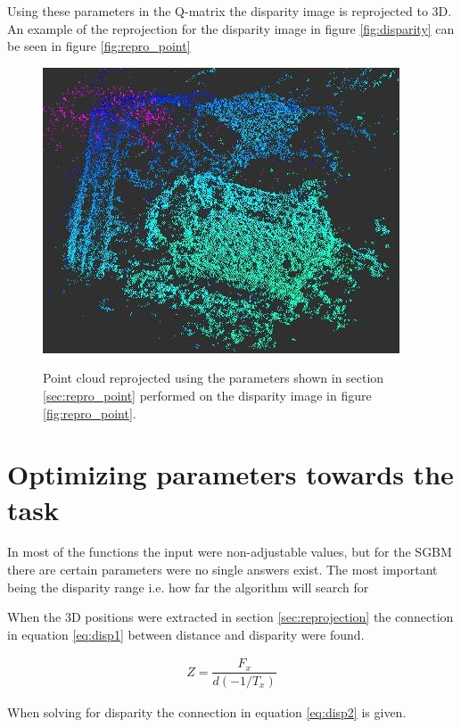 Using these parameters in the Q-matrix the disparity image is reprojected to 3D. An example of the reprojection for the disparity image in figure \ref{fig:disparity} can be seen in figure \ref{fig:repro_point}


\begin{figure}[h!]
  \caption{Point cloud reprojected using the parameters shown in section \ref{sec:repro_point} performed on the disparity image in figure \ref{fig:repro_point}. }
  \centering
    \includegraphics[scale=0.7]{graphics/06_vision/point_cloud_example2.jpg} %
    \label{fig:point_repro}
\end{figure}


\section{ Optimizing parameters towards the task } \label{sec:optimizing_parameters}

In most of the functions the input were non-adjustable values, but for the SGBM there are certain parameters were no single answers exist. The most important being the disparity range i.e. how far the algorithm will search for 


When the 3D positions were extracted in section \ref{sec:reprojection} the connection in equation \ref{eq:disp1} between distance and disparity were found.

\begin{equation}\label{eq:disp1}
\begin{split}
Z = \dfrac{F_{x}}{ d(-1/T_{x})}
\end{split}
\end{equation} 

When solving for disparity the connection in equation \ref{eq:disp2} is given.

